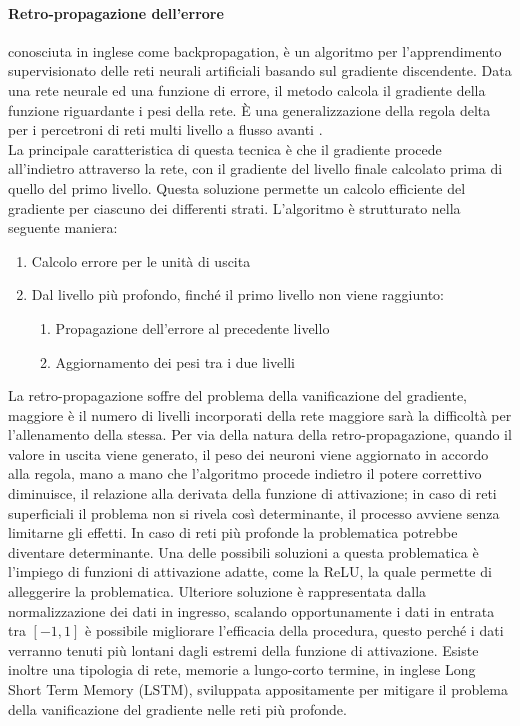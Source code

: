 \documentclass[%
    corpo=12pt,
    twoside,
    oldstyle,
    autoretitolo,
    greek,
    evenboxes,
]{toptesi}
\begin{document}
\paragraph{Retro-propagazione dell'errore} conosciuta in inglese come backpropagation, è un algoritmo per l'apprendimento supervisionato delle reti neurali artificiali basando sul gradiente discendente. Data una rete neurale ed una funzione di errore, il metodo calcola il gradiente della funzione riguardante i pesi della rete. È una generalizzazione della regola delta per i percetroni di reti multi livello a flusso avanti \cite{bp}.\\
La principale caratteristica di questa tecnica è che il gradiente procede all'indietro attraverso la rete, con il gradiente del livello finale calcolato prima di quello del primo livello. Questa soluzione permette un calcolo efficiente del gradiente per ciascuno dei differenti strati. L'algoritmo è strutturato nella seguente maniera:
\begin{enumerate}
  \item Calcolo errore per le unità di uscita
  \item Dal livello più profondo, finché il primo livello non viene raggiunto:
  \begin{enumerate}
    \item Propagazione dell'errore al precedente livello
    \item Aggiornamento dei pesi tra i due livelli
  \end{enumerate}
\end{enumerate}
La retro-propagazione soffre del problema della vanificazione del gradiente, maggiore è il numero di livelli incorporati della rete maggiore sarà la difficoltà per l'allenamento della stessa. Per via della natura della retro-propagazione, quando il valore in uscita viene generato, il peso dei neuroni viene aggiornato in accordo alla regola, mano a mano che l'algoritmo procede indietro il potere correttivo diminuisce, il relazione alla derivata della funzione di attivazione; in caso di reti superficiali il problema non si rivela così determinante, il processo avviene senza limitarne gli effetti. In caso di reti più profonde la problematica potrebbe diventare determinante. Una delle possibili soluzioni a questa problematica è l'impiego di funzioni di attivazione adatte, come la ReLU, la quale permette di alleggerire la problematica. Ulteriore soluzione è rappresentata dalla normalizzazione dei dati in ingresso, scalando opportunamente i dati in entrata tra $[-1, 1]$ è possibile migliorare l'efficacia della procedura, questo perché i dati verranno tenuti più lontani dagli estremi della funzione di attivazione. Esiste inoltre una tipologia di rete, memorie a lungo-corto termine, in inglese Long Short Term Memory (LSTM), sviluppata appositamente per mitigare il problema della vanificazione del gradiente nelle reti più profonde.
\end{document}
